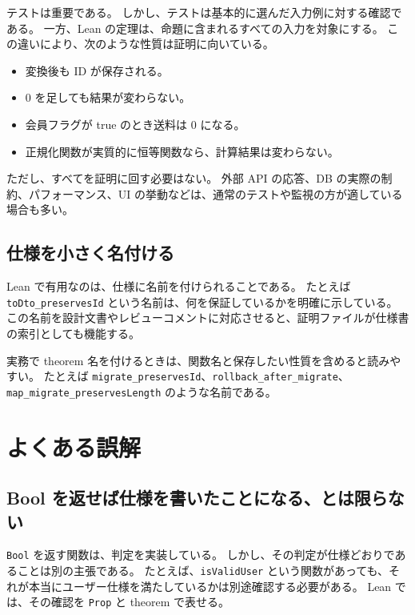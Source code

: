 テストは重要である。
しかし、テストは基本的に選んだ入力例に対する確認である。
一方、Lean の定理は、命題に含まれるすべての入力を対象にする。
この違いにより、次のような性質は証明に向いている。

\begin{itemize}
\item 変換後も ID が保存される。
\item 0 を足しても結果が変わらない。
\item 会員フラグが true のとき送料は 0 になる。
\item 正規化関数が実質的に恒等関数なら、計算結果は変わらない。
\end{itemize}

ただし、すべてを証明に回す必要はない。
外部 API の応答、DB の実際の制約、パフォーマンス、UI の挙動などは、通常のテストや監視の方が適している場合も多い。

\subsection{仕様を小さく名付ける}

Lean で有用なのは、仕様に名前を付けられることである。
たとえば \texttt{toDto\_preservesId} という名前は、何を保証しているかを明確に示している。
この名前を設計文書やレビューコメントに対応させると、証明ファイルが仕様書の索引としても機能する。

\begin{softwarebox}
実務で theorem 名を付けるときは、関数名と保存したい性質を含めると読みやすい。
たとえば \texttt{migrate\_preservesId}、\texttt{rollback\_after\_migrate}、\texttt{map\_migrate\_preservesLength} のような名前である。
\end{softwarebox}

\section{よくある誤解}

\subsection{Bool を返せば仕様を書いたことになる、とは限らない}

\texttt{Bool} を返す関数は、判定を実装している。
しかし、その判定が仕様どおりであることは別の主張である。
たとえば、\texttt{isValidUser} という関数があっても、それが本当にユーザー仕様を満たしているかは別途確認する必要がある。
Lean では、その確認を \texttt{Prop} と theorem で表せる。

